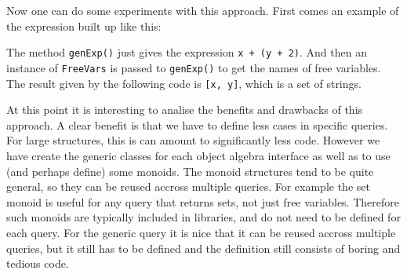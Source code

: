 Now one can do some experiments with this approach. First comes an example of the expression built up like this:


The method \lstinline{genExp()} just gives the expression \lstinline{x + (y + 2)}. And then an instance of \lstinline{FreeVars} is passed to \lstinline{genExp()} to get the names of free variables.
The result given by the following code is \lstinline{[x, y]}, which is a set of strings.



At this point it is interesting to analise the benefits and drawbacks
of this approach. A clear benefit is that we have to define less cases
in specific queries. For large structures, this is can amount to
significantly less code. However we have create the generic
classes for each object algebra interface as well as to use (and
perhaps define) some monoids. The monoid structures tend to be
quite general, so they can be reused accross multiple queries. For example
the set monoid is useful for any query that returns sets, not just
free variables. Therefore such monoids are typically included in
libraries, and do not need to be defined for each query.
For the generic query it is nice that it can be reused accross multiple
queries, but it still has to be defined and the definition still
consists of boring and tedious code.


\begin{comment}
But the result for an expression can only be a null list based on the
monoid. Thus in the freeVars query, furthermore, we expect the
variables to store their names into a list, and by using the monoid,
freeVars can be implemented. See Fig.~\ref{freevars_with_monoid}.


When the interface \lstinline{FreeVarsExpAlg} is used, an object of
the \lstinline{FreeVarsMonoid} is then created. As we can see, it is
needless for a user to write an exclusive traversal fully for a data
structure. Nothing but a monoid is required together with a few
methods being overwritten. And furthermore, a monoid can usually be
shared among query algebras with the same data type.
\end{comment}

